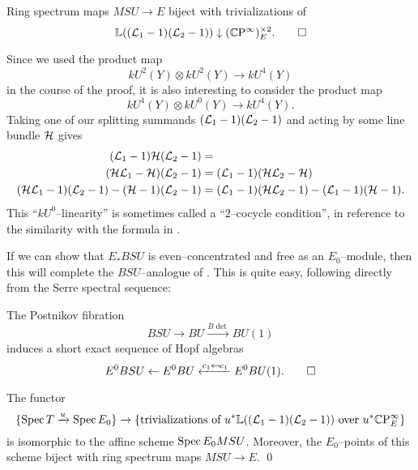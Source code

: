 \begin{corollary}
Ring spectrum maps $MSU \to E$ biject with trivializations of \[\mathbb{L}((\mathcal{L}_1 - 1)(\mathcal{L}_2 - 1)) \downarrow (\mathbb{C}\mathrm P^\infty)^{\times 2}_E. \qed \]
\end{corollary}

\begin{remark}\label{TwoCocycleConditionForBSUBundles}
Since we used the product map \[kU^2(Y) \otimes kU^2(Y) \to kU^4(Y)\] in the course of the proof, it is also interesting to consider the product map \[kU^4(Y) \otimes kU^0(Y) \to kU^4(Y).\]  Taking one of our splitting summands $(\mathcal{L}_1 - 1)(\mathcal{L}_2 - 1)$ and acting by some line bundle $\mathcal{H}$ gives
\begin{align*}
(\mathcal{L}_1-1)\mathcal{H}(\mathcal{L}_2 - 1) & = \\
(\mathcal{H} \mathcal{L}_1 - \mathcal{H})(\mathcal{L}_2 - 1) & = (\mathcal{L}_1-1)(\mathcal{H} \mathcal{L}_2 - \mathcal{H}) \\
(\mathcal{H} \mathcal{L}_1 - 1)(\mathcal{L}_2 - 1) - (\mathcal{H} - 1)(\mathcal{L}_2 - 1) & = (\mathcal{L}_1 - 1)(\mathcal{H} \mathcal{L}_2 - 1) - (\mathcal{L}_1 - 1)(\mathcal{H} - 1).
\end{align*}
This ``$kU^0$--linearity'' is sometimes called a ``$2$--cocycle condition'', in reference to the similarity with the formula in .
\end{remark}

If we can show that $E_* BSU$ is even--concentrated and free as an $E_0$--module, then this will complete the $BSU$--analogue of .  This is quite easy, following directly from the Serre spectral sequence:
\begin{lemma}\label{BSUtoBUtoCPinftyIsSexseq}
The Postnikov fibration \[BSU \to BU \xrightarrow{B\det} BU(1)\] induces a short exact sequence of Hopf algebras \[E^0 BSU \leftarrow E^0 BU \xleftarrow{c_1 \mapsfrom c_1} E^0 BU(1). \qed\]
\end{lemma}
\begin{corollary}\label{BSUTriumvirate}
The functor \[\{\operatorname{Spec} T \xrightarrow{u} \operatorname{Spec} E_0\} \to \left\{ \text{trivializations of $u^* \mathbb{L}((\mathcal{L}_1 - 1)(\mathcal{L}_2 - 1))$ over $u^* \mathbb{C}\mathrm P^\infty_E$} \right\}\] is isomorphic to the affine scheme $\operatorname{Spec} E_0 MSU$.  Moreover, the $E_0$--points of this scheme biject with ring spectrum maps $MSU \to E$. \qed
\end{corollary}

